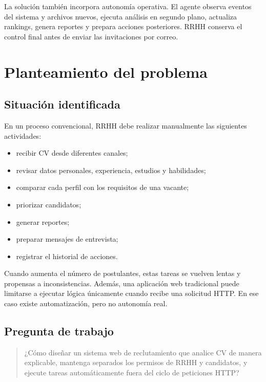 \documentclass[12pt,a4paper]{article}
\begin{document}
La solución también incorpora autonomía operativa. El agente observa eventos del sistema y archivos nuevos, ejecuta análisis en segundo plano, actualiza rankings, genera reportes y prepara acciones posteriores. RRHH conserva el control final antes de enviar las invitaciones por correo.

\section{Planteamiento del problema}

\subsection{Situación identificada}

En un proceso convencional, RRHH debe realizar manualmente las siguientes actividades:

\begin{itemize}[leftmargin=*]
    \item recibir CV desde diferentes canales;
    \item revisar datos personales, experiencia, estudios y habilidades;
    \item comparar cada perfil con los requisitos de una vacante;
    \item priorizar candidatos;
    \item generar reportes;
    \item preparar mensajes de entrevista;
    \item registrar el historial de acciones.
\end{itemize}

Cuando aumenta el número de postulantes, estas tareas se vuelven lentas y propensas a inconsistencias. Además, una aplicación web tradicional puede limitarse a ejecutar lógica únicamente cuando recibe una solicitud HTTP. En ese caso existe automatización, pero no autonomía real.

\subsection{Pregunta de trabajo}

\begin{quote}
¿Cómo diseñar un sistema web de reclutamiento que analice CV de manera explicable, mantenga separados los permisos de RRHH y candidatos, y ejecute tareas automáticamente fuera del ciclo de peticiones HTTP?
\end{quote}
\end{document}
